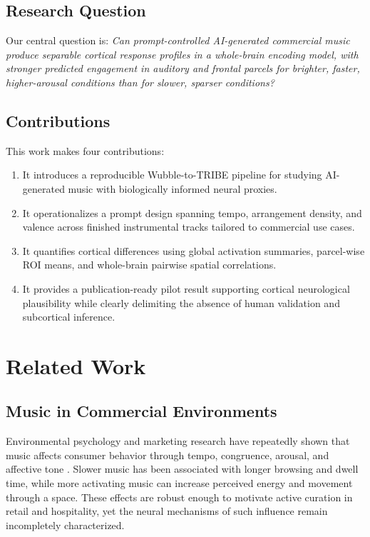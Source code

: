 \documentclass[conference]{IEEEtran}
\begin{document}
\subsection{Research Question}

Our central question is: \emph{Can prompt-controlled AI-generated commercial music produce separable cortical response profiles in a whole-brain encoding model, with stronger predicted engagement in auditory and frontal parcels for brighter, faster, higher-arousal conditions than for slower, sparser conditions?}

\subsection{Contributions}

This work makes four contributions:
\begin{enumerate}
    \item It introduces a reproducible Wubble-to-TRIBE pipeline for studying AI-generated music with biologically informed neural proxies.
    \item It operationalizes a prompt design spanning tempo, arrangement density, and valence across finished instrumental tracks tailored to commercial use cases.
    \item It quantifies cortical differences using global activation summaries, parcel-wise ROI means, and whole-brain pairwise spatial correlations.
    \item It provides a publication-ready pilot result supporting cortical neurological plausibility while clearly delimiting the absence of human validation and subcortical inference.
\end{enumerate}

\section{Related Work}

\subsection{Music in Commercial Environments}

Environmental psychology and marketing research have repeatedly shown that music affects consumer behavior through tempo, congruence, arousal, and affective tone \cite{north1999,garlin2006,bruner1990}. Slower music has been associated with longer browsing and dwell time, while more activating music can increase perceived energy and movement through a space. These effects are robust enough to motivate active curation in retail and hospitality, yet the neural mechanisms of such influence remain incompletely characterized.
\end{document}
